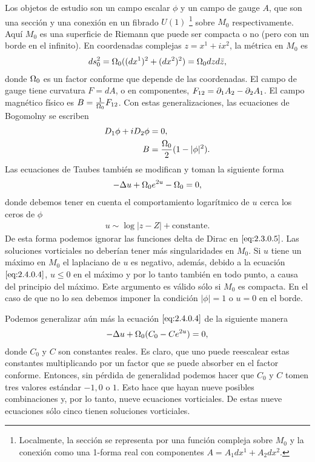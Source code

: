 Los objetos de estudio son un campo escalar $\phi$ y un campo de gauge $A$, que son una sección y una conexión en un fibrado $U(1)$ \footnote{Localmente, la sección se representa por una función compleja sobre $M_0$ y la conexión como una 1-forma real con componentes $A=A_1dx^1+A_2dx^2$.} sobre $M_0$ respectivamente. Aquí $M_0$ es una superficie de Riemann que puede ser compacta o no (pero con un borde en el infinito). En coordenadas complejas $z=x^1+ix^2$, la métrica en $M_0$ es
\begin{align}
    ds_0^2 = \Omega_0((dx^1)^2+(dx^2)^2)=\Omega_0 dzd\bar z, \label{2.4.0.1}
\end{align}
donde $\Omega_0$ es un factor conforme que depende de las coordenadas. El campo de gauge tiene curvatura $F=dA$, o en componentes, $F_{12}=\partial_1 A_2-\partial_2 A_1$. El campo magnético físico es $B=\frac{1}{\Omega_0}F_{12}$. Con estas generalizaciones, las ecuaciones de Bogomolny se escriben
\begin{align}
    D_1\phi+iD_2\phi &= 0, \label{2.4.0.2}\\
    B &= \frac{\Omega_0}{2}(1-|\phi|^2).\label{2.4.0.3}
\end{align}
Las ecuaciones de Taubes también se modifican y toman la siguiente forma
\begin{align}
    -\Delta u+\Omega_0 e^{2u}-\Omega_0 =0, \label{eq:2.4.0.4}
\end{align}
donde debemos tener en cuenta el comportamiento logarítmico de $u$ cerca los ceros de $\phi$
\begin{align}
    u\sim \log |z-Z|+\text{constante}. \label{eq:2.4.0.5}
\end{align}
De esta forma podemos ignorar las funciones delta de Dirac en $\eqref{eq:2.3.0.5}$. Las soluciones vorticiales no deberían tener más singularidades en $M_0$. Si $u$ tiene un máximo en $M_0$ el laplaciano de $u$ es negativo, además, debido a la ecuación $\eqref{eq:2.4.0.4}$, $u\leq 0$ en el máximo y por lo tanto también en todo punto, a causa del principio del máximo. Este argumento es válido sólo si $M_0$ es compacta. En el caso de que no lo sea debemos imponer la condición $|\phi|=1$ o $u=0$ en el borde.

Podemos generalizar aún más la ecuación $\eqref{eq:2.4.0.4}$ de la siguiente manera
\begin{align}
    -\Delta u+\Omega_0(C_0-Ce^{2u}) =0, \label{eq:2.4.0.6}
\end{align}
donde $C_0$ y $C$ son constantes reales. Es claro, que uno puede reescalear estas constantes multiplicando por un factor que se puede absorber en el factor conforme. Entonces, sin pérdida de generalidad podemos hacer que $C_0$ y $C$ tomen tres valores estándar $-1,0$ o $1$. Esto hace que hayan nueve posibles combinaciones y, por lo tanto, nueve ecuaciones vorticiales.  De estas nueve ecuaciones sólo cinco tienen soluciones vorticiales.

